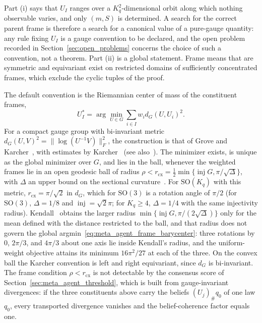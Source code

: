 \documentclass[11pt]{article}
\begin{document}
Part (i) says that $U_I$ ranges over a $K_q^2$-dimensional orbit along which nothing observable varies, and only $(m, S)$ is determined. A search for the correct parent frame is therefore a search for a canonical value of a pure-gauge quantity: any rule fixing $U_I$ is a gauge convention to be declared, and the open problem recorded in Section~\ref{sec:open_problems} concerns the choice of such a convention, not a theorem. Part (ii) is a global statement. Frame means that are symmetric and equivariant exist on restricted domains of sufficiently concentrated frames, which exclude the cyclic tuples of the proof.

The default convention is the Riemannian center of mass of the constituent frames,
\begin{equation}
U_I^* = \arg\min_{U \in G} \sum_{i \in I} w_i d_G(U, U_i)^2.
\label{eq:meta_agent_frame_barycenter}
\end{equation}
For a compact gauge group with bi-invariant metric $d_G(U, V)^2 = \|\log(U^{-1}V)\|_F^2$, the construction is that of Grove and Karcher~\cite{GroveKarcher1973}, with estimates by Karcher~\cite{Karcher1977} (see also~\cite{Pennec2009}). The minimizer exists, is unique as the global minimizer over $G$, and lies in the ball, whenever the weighted frames lie in an open geodesic ball of radius $\rho < r_{\mathrm{cx}} = \tfrac12\min\{\operatorname{inj} G, \pi/\sqrt{\Delta}\}$, with $\Delta$ an upper bound on the sectional curvature~\cite[Thm.~2.1]{Afsari2011}. For $\mathrm{SO}(K_q)$ with this metric, $r_{\mathrm{cx}} = \pi/\sqrt{2}$ in $d_G$, which for $\mathrm{SO}(3)$ is a rotation angle of $\pi/2$ (for $\mathrm{SO}(3)$, $\Delta = 1/8$ and $\operatorname{inj} = \sqrt{2}\pi$; for $K_q \ge 4$, $\Delta = 1/4$ with the same injectivity radius). Kendall~\cite{Kendall1990} obtains the larger radius $\min\{\operatorname{inj} G, \pi/(2\sqrt{\Delta})\}$ only for the mean defined with the distance restricted to the ball, and that radius does not govern the global argmin~\eqref{eq:meta_agent_frame_barycenter}: three rotations by $0$, $2\pi/3$, and $4\pi/3$ about one axis lie inside Kendall's radius, and the uniform-weight objective attains its minimum $16\pi^2/27$ at each of the three. On the convex ball the Karcher convention is left and right equivariant, since $d_G$ is bi-invariant. The frame condition $\rho < r_{\mathrm{cx}}$ is not detectable by the consensus score of Section~\ref{sec:meta_agent_threshold}, which is built from gauge-invariant divergences: if the three constituents above carry the beliefs $(U_j)_\# q_0$ of one law $q_0$, every transported divergence vanishes and the belief-coherence factor equals one.
\end{document}
